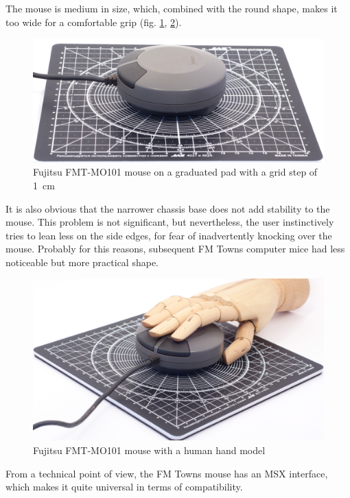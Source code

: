 \documentclass[11pt, a4paper]{article}
\begin{document}
The mouse is medium in size, which, combined with the round shape, makes it too wide \cite{twinklemagic} for a comfortable grip (fig. \ref{fig:FMT1Size}, \ref{fig:FMT1Hand}).

\begin{figure}[h]
    \centering
    \includegraphics[scale=0.48]{1989_fujitsu_fmt_mo101_mouse/size_30.jpg}
    \caption{Fujitsu FMT-MO101 mouse on a graduated pad with a grid step of 1~cm}
    \label{fig:FMT1Size}
\end{figure}

It is also obvious that the narrower chassis base does not add stability to the mouse. This problem is not significant, but nevertheless, the user instinctively tries to lean less on the side edges, for fear of inadvertently knocking over the mouse. Probably for this reasons, subsequent FM Towns computer mice had less noticeable but more practical shape.

\begin{figure}[h]
    \centering
    \includegraphics[scale=0.47]{1989_fujitsu_fmt_mo101_mouse/hand_30.jpg}
    \caption{Fujitsu FMT-MO101 mouse with a human hand model}
    \label{fig:FMT1Hand}
\end{figure}

From a technical point of view, the FM Towns mouse has an MSX interface, which makes it quite universal in terms of compatibility\cite{tepatti}.
\end{document}

